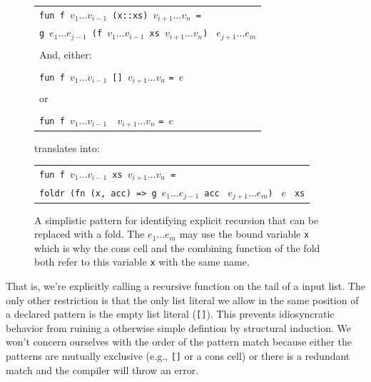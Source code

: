 \documentclass[12pt,abstracton]{scrartcl}
\begin{document}
\begin{figure}[!h]
\begin{center}
\begin{tabular}{|l|}\hline
\texttt{fun f }\(v_{1}\ldots v_{i-1}\)\texttt{ (x::xs) }\(v_{i+1}\ldots v_{n}\)\texttt{ =}\\
\hspace{0.5in}\texttt{g }\(e_{1}\ldots e_{j-1}\)\texttt{ (f }\(v_{1}\ldots v_{i-1}\)\texttt{ xs }\(v_{i+1}\ldots v_{n}\)\texttt{) } \(e_{j+1}\ldots e_{m}\)\\
\\
And, either:\\
\\
\texttt{fun f }\(v_{1}\ldots v_{i-1}\)\texttt{ [] }\(v_{i+1}\ldots v_{n}\) \texttt{= }$e$\\
\\
or\\
\\
\texttt{fun f }\(v_{1}\ldots v_{i-1}\)\texttt{ }\underline{\hspace{0.1in}}\texttt{ }\(v_{i+1}\ldots v_{n}\) \texttt{= }$e$\\\hline
\end{tabular}
\newline\newline
translates into:
\newline\newline
\begin{tabular}{|l|}\hline
\texttt{fun f }\(v_{1}\ldots v_{i-1}\)\texttt{ xs }\(v_{i+1}\ldots v_{n}\)\texttt{ =}\\
\hspace{0.5in}\texttt{foldr (fn (x, acc) => g }\(e_{1}\ldots e_{j-1}\)\texttt{ acc } \(e_{j+1}\ldots e_{m}\)\texttt{) } $e$ \texttt{ xs}\\
\hline
\end{tabular}
\end{center}
\caption{A simplistic pattern for identifying explicit recursion that can be replaced with a fold. The $e_{1}\ldots e_{m}$ may use the bound variable \texttt{x}
which is why the cons cell and the combining function of the fold both refer to this variable \texttt{x} with the same name.}
\label{fig:folddef}
\end{figure}

That is, we're explicitly calling a recursive function on the tail of a input list.
The only other restriction is that the only list literal we allow in the same position of
a declared pattern is the empty list literal (\texttt{[]}). This prevents idiosyncratic
behavior from ruining a otherwise simple defintion by structural induction.
We won't concern ourselves with the order of the pattern match because either the patterns
are mutually exclusive (e.g., \texttt{[]} or a cons cell) or there is a redundant match
and the compiler will throw an error.
\end{document}
